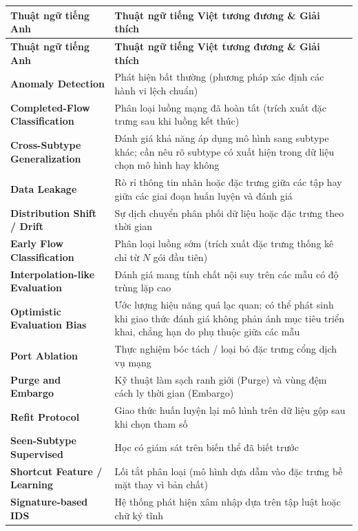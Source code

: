 \begin{longtable}{p{5.5cm}p{9.0cm}}
\toprule
\textbf{Thuật ngữ tiếng Anh} & \textbf{Thuật ngữ tiếng Việt tương đương \& Giải thích} \\
\midrule
\endfirsthead
\toprule
\textbf{Thuật ngữ tiếng Anh} & \textbf{Thuật ngữ tiếng Việt tương đương \& Giải thích} \\
\midrule
\endhead
\bottomrule
\endfoot

\textbf{Anomaly Detection} & Phát hiện bất thường (phương pháp xác định các hành vi lệch chuẩn) \\
\textbf{Completed-Flow Classification} & Phân loại luồng mạng đã hoàn tất (trích xuất đặc trưng sau khi luồng kết thúc) \\
\textbf{Cross-Subtype Generalization} & Đánh giá khả năng áp dụng mô hình sang subtype khác; cần nêu rõ subtype có xuất hiện trong dữ liệu chọn mô hình hay không \\
\textbf{Data Leakage} & Rò rỉ thông tin nhãn hoặc đặc trưng giữa các tập hay giữa các giai đoạn huấn luyện và đánh giá \\
\textbf{Distribution Shift / Drift} & Sự dịch chuyển phân phối dữ liệu hoặc đặc trưng theo thời gian \\
\textbf{Early Flow Classification} & Phân loại luồng sớm (trích xuất đặc trưng thống kê chỉ từ $N$ gói đầu tiên) \\
\textbf{Interpolation-like Evaluation} & Đánh giá mang tính chất nội suy trên các mẫu có độ trùng lặp cao \\
\textbf{Optimistic Evaluation Bias} & Ước lượng hiệu năng quá lạc quan; có thể phát sinh khi giao thức đánh giá không phản ánh mục tiêu triển khai, chẳng hạn do phụ thuộc giữa các mẫu \\
\textbf{Port Ablation} & Thực nghiệm bóc tách / loại bỏ đặc trưng cổng dịch vụ mạng \\
\textbf{Purge and Embargo} & Kỹ thuật làm sạch ranh giới (Purge) và vùng đệm cách ly thời gian (Embargo) \\
\textbf{Refit Protocol} & Giao thức huấn luyện lại mô hình trên dữ liệu gộp sau khi chọn tham số \\
\textbf{Seen-Subtype Supervised} & Học có giám sát trên biến thể đã biết trước \\
\textbf{Shortcut Feature / Learning} & Lối tắt phân loại (mô hình dựa dẫm vào đặc trưng bề mặt thay vì bản chất) \\
\textbf{Signature-based IDS} & Hệ thống phát hiện xâm nhập dựa trên tập luật hoặc chữ ký tĩnh \\

\end{longtable}
